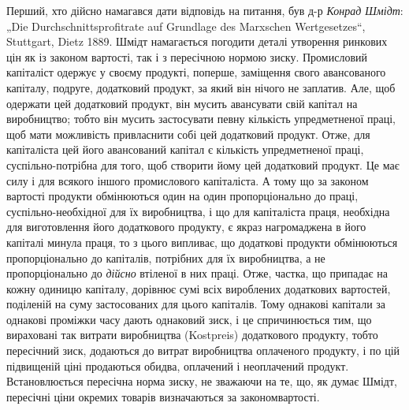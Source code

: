 Перший, хто дійсно намагався дати відповідь на питання, був
д-р \emph{Конрад Шмідт}: „Die Durchschnittsprofitrate auf Grundlage des
Marxschen Wertgesetzes“, Stuttgart, Dietz 1889. Шмідт намагається
погодити деталі утворення ринкових цін як із законом
вартості, так і з пересічною нормою зиску. Промисловий капіталіст
одержує у своєму продукті, поперше, заміщення свого
авансованого капіталу, подруге, додатковий продукт, за який
він нічого не заплатив. Але, щоб одержати цей додатковий
продукт, він мусить авансувати свій капітал на виробництво;
тобто він мусить застосувати певну кількість упредметненої
праці, щоб мати можливість привласнити собі цей додатковий продукт.
Отже, для капіталіста цей його авансований капітал є кількість
упредметненої праці, суспільно-потрібна для того, щоб
створити йому цей додатковий продукт. Це має силу і для всякого
іншого промислового капіталіста. А тому що за законом
вартості продукти обмінюються один на один пропорціонально
до праці, суспільно-необхідної для їх виробництва, і що для капіталіста
праця, необхідна для виготовлення його додаткового продукту,
є якраз нагромаджена в його капіталі минула праця, то
з цього випливає, що додаткові продукти обмінюються пропорціонально
до капіталів, потрібних для їх виробництва, а не пропорціонально
до \emph{дійсно} втіленої в них праці. Отже, частка, що
припадає на кожну одиницю капіталу, дорівнює сумі всіх вироблених
додаткових вартостей, поділеній на суму застосованих
для цього капіталів. Тому однакові капітали за однакові проміжки
часу дають однаковий зиск, і це спричинюється тим, що
вираховані так витрати виробництва (Kostpreis) додаткового
продукту, тобто пересічний зиск, додаються до витрат виробництва
оплаченого продукту, і по цій підвищеній ціні продаються
обидва, оплачений і неоплачений продукт. Встановлюється
пересічна норма зиску, не зважаючи на те, що, як
думає Шмідт, пересічні ціни окремих товарів визначаються за
законом\linebreak[4]
вартості.

